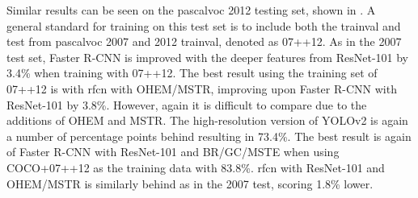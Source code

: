 Similar results can be seen on the \gls{pascalvoc} 2012 testing set, shown in . A general standard for training on this test set is to include both the trainval and test from \gls{pascalvoc} 2007 and 2012 trainval, denoted as 07++12. As in the 2007 test set, Faster R-CNN is improved with the deeper features from ResNet-101 by 3.4\% when training with 07++12. The best result using the training set of 07++12 is with \gls{rfcn} with OHEM/MSTR, improving upon Faster R-CNN with ResNet-101 by 3.8\%. However, again it is difficult to compare due to the additions of OHEM and MSTR. The high-resolution version of YOLOv2 is again a number of percentage points behind resulting in 73.4\%. The best result is again of Faster R-CNN with ResNet-101 and BR/GC/MSTE when using COCO+07++12 as the training data with 83.8\%. \gls{rfcn} with ResNet-101 and OHEM/MSTR is similarly behind as in the 2007 test, scoring 1.8\% lower.


